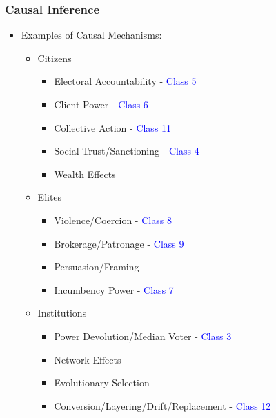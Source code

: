 \documentclass[xcolor=x11names,compress]{beamer}\usepackage[]{graphicx}\usepackage[]{color}
\renewcommand{\(}{\begin{columns}}
\renewcommand{\)}{\end{columns}}
\newcommand{\<}[1]{\begin{column}{#1}}
\renewcommand{\>}{\end{column}}
\begin{document}
\begin{frame}
\frametitle{Causal Inference}
\begin{itemize}
\item Examples of Causal Mechanisms:
\begin{itemize}
\item Citizens
\begin{itemize}
\item Electoral Accountability - \textcolor{blue}{Class 5}
\item Client Power - \textcolor{blue}{Class 6}
\item Collective Action - \textcolor{blue}{Class 11}
\item Social Trust/Sanctioning - \textcolor{blue}{Class 4}
\item Wealth Effects
\end{itemize}
\item Elites
\begin{itemize}
\item Violence/Coercion - \textcolor{blue}{Class 8}
\item Brokerage/Patronage - \textcolor{blue}{Class 9}
\item Persuasion/Framing
\item Incumbency Power - \textcolor{blue}{Class 7}
\end{itemize}
\item Institutions
\begin{itemize}
\item Power Devolution/Median Voter - \textcolor{blue}{Class 3}
\item Network Effects
\item Evolutionary Selection
\item Conversion/Layering/Drift/Replacement - \textcolor{blue}{Class 12}
\end{itemize}
\end{itemize}
\end{itemize}
\end{frame}
\end{document}
